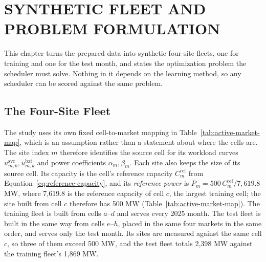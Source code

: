 \documentclass{UNCC-thesis}
\begin{document}
\chapter{SYNTHETIC FLEET AND PROBLEM FORMULATION}
\label{chap:problem}

This chapter turns the prepared data into synthetic four-site fleets, one
for training and one for the test month, and states the optimization problem
the scheduler must solve. Nothing in it
depends on the learning method, so any scheduler can be scored against the
same problem.

\section{The Four-Site Fleet}
\label{sec:data-transformations}
\label{subsec:transform-mapping}

The study uses its own fixed cell-to-market mapping in
Table~\ref{tab:active-market-map}, which is an assumption rather than a
statement about where the cells are. The site index \(m\)
therefore identifies the source cell for its workload curves
\(u^{\mathrm{svc}}_{m,k},u^{\mathrm{bat}}_{m,k}\) and power coefficients
\(\alpha_m,\beta_m\). Each site also keeps the size of its source cell.
Its capacity is the cell's reference capacity \(C^{\mathrm{ref}}_m\) from
Equation~\eqref{eq:reference-capacity}, and its \emph{reference power} is
\(\overline P_m=500\,C^{\mathrm{ref}}_m/7{,}619.8\) MW, where 7,619.8 is the
reference capacity of cell \(c\), the largest training cell; the site built
from cell \(c\) therefore has 500 MW (Table~\ref{tab:active-market-map}). The training fleet is built from
cells \(a\)--\(d\) and serves every 2025 month. The test fleet is built in the
same way from cells \(e\)--\(h\), placed in the same four markets in the same
order, and serves only the test month. Its sites are measured against the
same cell \(c\), so three of them exceed 500 MW, and the test fleet totals
2,398 MW against the training fleet's 1,869 MW.
\end{document}
